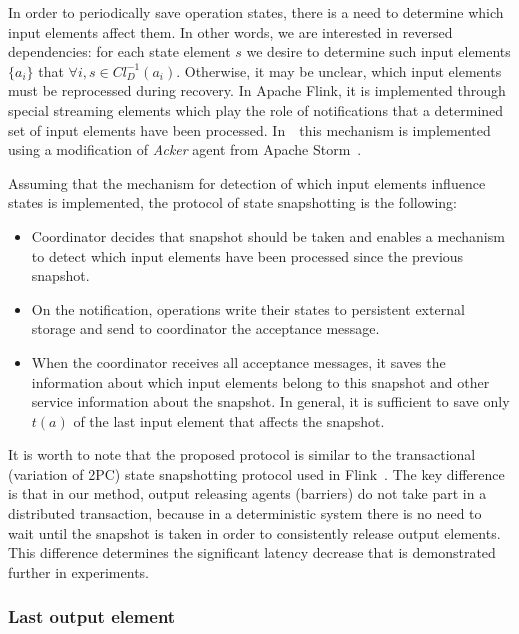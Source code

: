 In order to periodically save operation states, there is a need to determine which input elements affect them. In other words, we are interested in reversed dependencies: for each state element $s$ we desire to determine such input elements $\{a_i\}$ that $\forall i, s \in Cl_D^{-1}(a_i)$. Otherwise, it may be unclear, which input elements must be reprocessed during recovery. In Apache Flink, it is implemented through special streaming elements which play the role of notifications that a determined set of input elements have been processed. In~\FlameStream\ this mechanism is implemented using a modification of {\em Acker} agent from Apache Storm~\cite{apache:storm}. 

Assuming that the mechanism for detection of which input elements influence states is implemented, the protocol of state snapshotting is the following:

\begin{itemize}
    \item Coordinator decides that snapshot should be taken and enables a mechanism to detect which input elements have been processed since the previous snapshot.
    \item On the notification, operations write their states to persistent external storage and send to coordinator the acceptance message.
    \item When the coordinator receives all acceptance messages, it saves the information about which input elements belong to this snapshot and other service information about the snapshot. In general, it is sufficient to save only $t(a)$ of the last input element that affects the snapshot.
\end{itemize}

It is worth to note that the proposed protocol is similar to the transactional (variation of 2PC) state snapshotting protocol used in Flink~\cite{Carbone:2017:SMA:3137765.3137777}. The key difference is that in our method, output releasing agents (barriers) do not take part in a distributed transaction, because in a deterministic system there is no need to wait until the snapshot is taken in order to consistently release output elements. This difference determines the significant latency decrease that is demonstrated further in experiments.

\subsubsection{Last output element}

